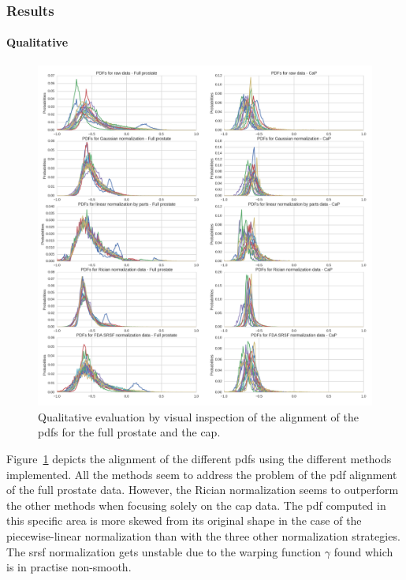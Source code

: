 \subsubsection{Results}\label{subsub:chp5:T2-norm:res}
\paragraph{Qualitative}

\begin{figure}
  \centering
  \includegraphics[width=1.\textwidth]{5_normalization/figures/T2-normalization/qualitative.png}
  \caption{Qualitative evaluation by visual inspection of the alignment of the \ac{pdf}s for the full prostate and the \ac{cap}.}
  \label{fig:qu}
\end{figure}

Figure~\ref{fig:qu} depicts the alignment of the different \ac{pdf}s using the different methods implemented. 
All the methods seem to address the problem of the \ac{pdf} alignment of the full prostate data.
However, the Rician normalization seems to outperform the other methods when focusing solely on the \ac{cap} data.
The \ac{pdf} computed in this specific area is more skewed from its original shape in the case of the piecewise-linear normalization than with the three other normalization strategies.
The \ac{srsf} normalization gets unstable due to the warping function $\gamma$ found which is in practise non-smooth.

